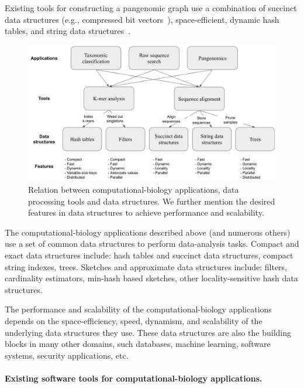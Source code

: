 \begin{itemize}[leftmargin=*]
Existing tools for constructing a pangenomic graph use a combination of succinct data structures (e.g., compressed bit vectors~\cite{garrison2018variation}), space-efficient, dynamic hash tables, and string data structures~\cite{pandey2021variantstore}.

\end{itemize}

\setlength\intextsep{0pt}
\begin{figure}
\vspace{-5pt}
\centering
\includegraphics[width=\textwidth]{images/PPOSS_App_DS.png}
\caption{Relation between computational-biology applications, data processing tools and data structures. We further mention the desired features in data structures to achieve performance and scalability.}
\label{fig1}
\end{figure}


The computational-biology applications described above (and numerous others)  use a set of common data structures to perform data-analysis tasks.
Compact and exact data structures include: hash tables and succinct data structures, compact string indexes, trees.
Sketches and approximate data structures include: filters, cardinality estimators,  min-hash based sketches, other locality-sensitive hash data structures.

The performance and scalability of the computational-biology applications
depends on the space-efficiency, speed, dynamism, and scalability of the
underlying data structures they use. These data structures are also the building
blocks in many other domains, such databases, machine learning, software
systems, security applications, etc.


\paragraph{Existing software tools for computational-biology applications.}

